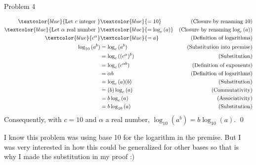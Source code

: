 \begin{problem}{Problem 4}
\begin{highlight}[Solution]
        \begin{align*}
            \textcolor{blue}{\text{Let } c \text{ integer }} & \textcolor{blue}{ = 10} & \text{(Closure by renaming $10$)} \\
            \textcolor{blue}{\text{Let } \alpha \text{ real number }} & \textcolor{blue}{ = \log_{c}{(a)}} & \text{(Closure by renaming $\log_{c}{(a)}$)} \\
            \textcolor{blue}{c^{\alpha}} & \textcolor{blue}{= a} & \text{(Definition of logarithms)} \\
            \log_{10}{(a^{b})} & = \log_{c}{(a^{b})} & \text{(Substitution into premise)} \\
            & = \log_{c}{((c^{\alpha})^{b})} & \text{(Substitution)} \\
            & = \log_{c}{(c^{\alpha b})} & \text{(Definition of exponents)} \\
            & = \alpha b & \text{(Definition of logarithms)} \\
            & = \log_{c}{(a)}(b) & \text{(Substitution)} \\
            & = (b)\log_{c}{(a)} & \text{(Commutativity)} \\
            & = b\log_{c}{(a)} & \text{(Associativity)} \\
            & = b\log_{10}{(a)} & \text{(Substitution)}
        \end{align*}
        Consequently, with $c = 10$ and $\alpha$ a real number, $\log_{10}{(a^{b})} = b \log_{10}{(a)}$. \qed  
    \end{highlight}

    \begin{highlight}[Notes]
        I know this problem was using base 10 for the logarithm in the premise. But I was very interested in how this could be generalized for other bases so that is why I made the substitution in my
        proof :)
    \end{highlight}
\end{problem}

